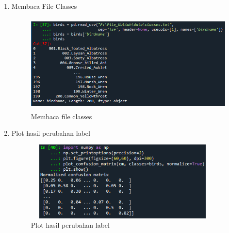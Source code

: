 \begin{enumerate}
    \item Membaca File Classes
    \begin{figure}[!htbp]
        \centering
        \includegraphics[width=11cm,height=5cm]{figures/read_classes.png}
        \caption{Membaca file classes}
        \label{penanda}
    \end{figure}

    \item Plot hasil perubahan label
    \begin{figure}[!htbp]
        \centering
        \includegraphics[width=10cm,height=4cm]{figures/plot_hasil_cm.png}
        \caption{Plot hasil perubahan label}
        \label{penanda}
    \end{figure}
\end{enumerate}

